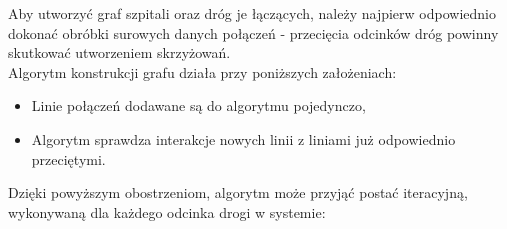 \documentclass{article}
\begin{document}
Aby utworzyć graf szpitali oraz dróg je łączących, należy najpierw odpowiednio dokonać obróbki surowych danych połączeń - przecięcia odcinków dróg powinny skutkować utworzeniem skrzyżowań. \\
Algorytm konstrukcji grafu działa przy poniższych założeniach:

\begin{itemize}
    \item Linie połączeń dodawane są do algorytmu pojedynczo,
    \item Algorytm sprawdza interakcje nowych linii z liniami już odpowiednio przeciętymi.
\end{itemize}

Dzięki powyższym obostrzeniom, algorytm może przyjąć postać iteracyjną, wykonywaną dla każdego odcinka drogi w systemie:
\end{document}
